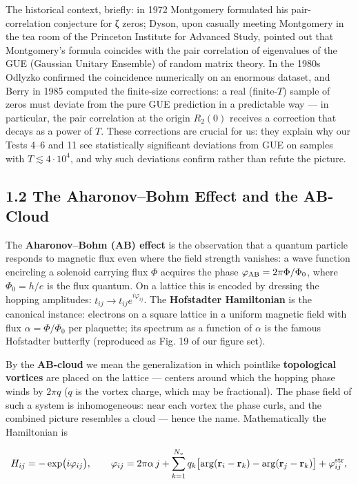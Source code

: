 \documentclass[
]{article}
\begin{document}
The historical context, briefly: in 1972 Montgomery formulated his
pair-correlation conjecture for ζ zeros; Dyson, upon casually meeting
Montgomery in the tea room of the Princeton Institute for Advanced
Study, pointed out that Montgomery's formula coincides with the pair
correlation of eigenvalues of the GUE (Gaussian Unitary Ensemble) of
random matrix theory. In the 1980s Odlyzko confirmed the coincidence
numerically on an enormous dataset, and Berry in 1985 computed the
finite-size corrections: a real (finite-\(T\)) sample of zeros must
deviate from the pure GUE prediction in a predictable way --- in
particular, the pair correlation at the origin \(R_2(0)\) receives a
correction that decays as a power of \(T\). These corrections are
crucial for us: they explain why our Tests 4--6 and 11 see statistically
significant deviations from GUE on samples with
\(T \lesssim 4\cdot10^4\), and why such deviations confirm rather than
refute the picture.

\subsection{1.2 The Aharonov--Bohm Effect and the
AB-Cloud}\label{the-aharonovbohm-effect-and-the-ab-cloud}

The \textbf{Aharonov--Bohm (AB) effect} is the observation that a
quantum particle responds to magnetic flux even where the field strength
vanishes: a wave function encircling a solenoid carrying flux \(\Phi\)
acquires the phase \(\varphi_{\rm AB} = 2\pi\Phi/\Phi_0\), where
\(\Phi_0 = h/e\) is the flux quantum. On a lattice this is encoded by
dressing the hopping amplitudes: \(t_{ij}\to t_{ij}e^{i\varphi_{ij}}\).
The \textbf{Hofstadter Hamiltonian} is the canonical instance: electrons
on a square lattice in a uniform magnetic field with flux
\(\alpha = \Phi/\Phi_0\) per plaquette; its spectrum as a function of
\(\alpha\) is the famous Hofstadter butterfly (reproduced as Fig. 19 of
our figure set).

By the \textbf{AB-cloud} we mean the generalization in which pointlike
\textbf{topological vortices} are placed on the lattice --- centers
around which the hopping phase winds by \(2\pi q\) (\(q\) is the vortex
charge, which may be fractional). The phase field of such a system is
inhomogeneous: near each vortex the phase curls, and the combined
picture resembles a cloud --- hence the name. Mathematically the
Hamiltonian is

\[H_{ij} = -\exp\bigl(i\varphi_{ij}\bigr),\qquad \varphi_{ij} = 2\pi\alpha\,j + \sum_{k=1}^{N_v} q_k\bigl[\arg(\mathbf r_i - \mathbf r_k) - \arg(\mathbf r_j - \mathbf r_k)\bigr] + \varphi^{\rm str}_{ij},\]
\end{document}
